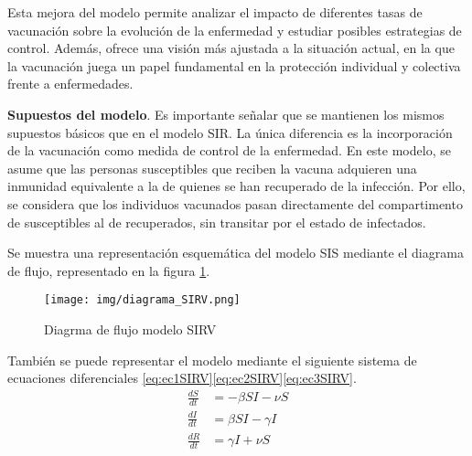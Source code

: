 Esta mejora del modelo permite analizar el impacto de diferentes tasas de vacunación sobre la evolución de la enfermedad y estudiar posibles estrategias de control. Además, ofrece una visión más ajustada a la situación actual, en la que la vacunación juega un papel fundamental en la protección individual y colectiva frente a enfermedades.

\textbf{Supuestos del modelo}. Es importante señalar que se mantienen los mismos supuestos básicos que en el modelo SIR. La única diferencia es la incorporación de la vacunación como medida de control de la enfermedad. En este modelo, se asume que las personas susceptibles que reciben la vacuna adquieren una inmunidad equivalente a la de quienes se han recuperado de la infección. Por ello, se considera que los individuos vacunados pasan directamente del compartimento de susceptibles al de recuperados, sin transitar por el estado de infectados.

Se muestra una representación esquemática del modelo SIS mediante el diagrama de flujo, representado en la figura \ref{fig:ejemplo SIRV}.

\begin{figure}[H]
    \centering
    \texttt{[image: img/diagrama\_SIRV.png]}
    \caption{Diagrma de flujo modelo SIRV}
    \label{fig:ejemplo SIRV}
    \vspace{0.5cm} %
\end{figure}

También se puede representar el modelo mediante el siguiente sistema de ecuaciones diferenciales \eqref{eq:ec1SIRV}\eqref{eq:ec2SIRV}\eqref{eq:ec3SIRV}.
\begin{align}
\frac{dS}{dt} &= -\beta SI - \nu S \label{eq:ec1SIRV} \\
\frac{dI}{dt} &= \beta SI - \gamma I \label{eq:ec2SIRV} \\
\frac{dR}{dt} &= \gamma I + \nu S \label{eq:ec3SIRV}
\end{align}

